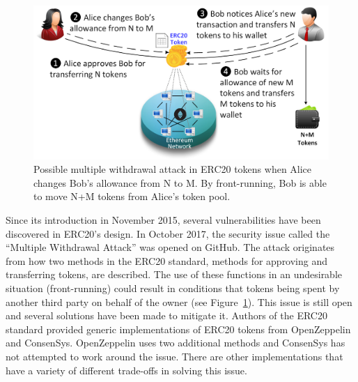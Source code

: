 
\begin{figure}[t!]
	\centering
	\includegraphics[width=0.7\linewidth]{figures/multiple_withdrawal_02.png}
	\caption{Possible multiple withdrawal attack in ERC20 tokens when Alice changes Bob's allowance from N to M. By front-running, Bob is able to move N+M tokens from Alice's token pool.\label{fig:mwa}}
\end{figure}

Since its introduction in November 2015, several vulnerabilities have been discovered in ERC20's design. In October 2017, the security issue called the ``Multiple Withdrawal Attack'' was opened on GitHub\cite{Ref13,Ref07}. The attack originates from how two methods in the ERC20 standard, methods for approving and transferring tokens, are described. The use of these functions in an undesirable situation (\eg front-running) could result in conditions that tokens being spent by another third party on behalf of the owner (see Figure~\ref{fig:mwa}). This issue is still open and several solutions have been made to mitigate it. Authors of the ERC20 standard \cite{Ref08} provided generic implementations of ERC20 tokens from OpenZeppelin\cite{Ref10} and ConsenSys\cite{Ref11}. OpenZeppelin uses two additional methods and ConsenSys has not attempted to work around the issue. There are other implementations that have a variety of different trade-offs in solving this issue. 

